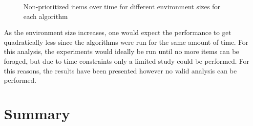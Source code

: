 \begin{figure}[!htb]
\centering
\resizebox{\textwidth}{!}{}
\caption{Non-prioritized items over time for different environment sizes for each algorithm}
\label{sizewasteplot}
\end{figure}

As the environment size increases, one would expect the performance to get quadratically less since the algorithms were run for the same amount of time. For this analysis, the experiments would ideally be run until no more items can be foraged, but due to time constraints only a limited study could be performed. For this reasons, the results have been presented however no valid analysis can be performed.

\section{Summary}
\label{results:summary}

